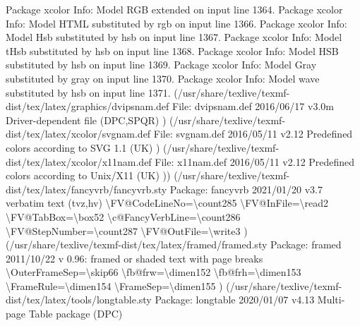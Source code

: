 \documentclass[
  letterpaper,
  DIV=11,
  numbers=noendperiod]{scrartcl}
\newenvironment{Shaded}{\begin{snugshade}}{\end{snugshade}}
\newcommand{\NormalTok}[1]{\textcolor[rgb]{0.00,0.23,0.31}{#1}}
\begin{document}
\begin{Shaded}
\begin{Highlighting}[]
\NormalTok{Package xcolor Info: Model \textasciigrave{}RGB\textquotesingle{} extended on input line 1364.}
\NormalTok{Package xcolor Info: Model \textasciigrave{}HTML\textquotesingle{} substituted by \textasciigrave{}rgb\textquotesingle{} on input line 1366.}
\NormalTok{Package xcolor Info: Model \textasciigrave{}Hsb\textquotesingle{} substituted by \textasciigrave{}hsb\textquotesingle{} on input line 1367.}
\NormalTok{Package xcolor Info: Model \textasciigrave{}tHsb\textquotesingle{} substituted by \textasciigrave{}hsb\textquotesingle{} on input line 1368.}
\NormalTok{Package xcolor Info: Model \textasciigrave{}HSB\textquotesingle{} substituted by \textasciigrave{}hsb\textquotesingle{} on input line 1369.}
\NormalTok{Package xcolor Info: Model \textasciigrave{}Gray\textquotesingle{} substituted by \textasciigrave{}gray\textquotesingle{} on input line 1370.}
\NormalTok{Package xcolor Info: Model \textasciigrave{}wave\textquotesingle{} substituted by \textasciigrave{}hsb\textquotesingle{} on input line 1371.}
\NormalTok{(/usr/share/texlive/texmf{-}dist/tex/latex/graphics/dvipsnam.def}
\NormalTok{File: dvipsnam.def 2016/06/17 v3.0m Driver{-}dependent file (DPC,SPQR)}
\NormalTok{) (/usr/share/texlive/texmf{-}dist/tex/latex/xcolor/svgnam.def}
\NormalTok{File: svgnam.def 2016/05/11 v2.12 Predefined colors according to SVG 1.1 (UK)}
\NormalTok{) (/usr/share/texlive/texmf{-}dist/tex/latex/xcolor/x11nam.def}
\NormalTok{File: x11nam.def 2016/05/11 v2.12 Predefined colors according to Unix/X11 (UK)}
\NormalTok{)) (/usr/share/texlive/texmf{-}dist/tex/latex/fancyvrb/fancyvrb.sty}
\NormalTok{Package: fancyvrb 2021/01/20 v3.7 verbatim text (tvz,hv)}
\NormalTok{\textbackslash{}FV@CodeLineNo=\textbackslash{}count285}
\NormalTok{\textbackslash{}FV@InFile=\textbackslash{}read2}
\NormalTok{\textbackslash{}FV@TabBox=\textbackslash{}box52}
\NormalTok{\textbackslash{}c@FancyVerbLine=\textbackslash{}count286}
\NormalTok{\textbackslash{}FV@StepNumber=\textbackslash{}count287}
\NormalTok{\textbackslash{}FV@OutFile=\textbackslash{}write3}
\NormalTok{) (/usr/share/texlive/texmf{-}dist/tex/latex/framed/framed.sty}
\NormalTok{Package: framed 2011/10/22 v 0.96: framed or shaded text with page breaks}
\NormalTok{\textbackslash{}OuterFrameSep=\textbackslash{}skip66}
\NormalTok{\textbackslash{}fb@frw=\textbackslash{}dimen152}
\NormalTok{\textbackslash{}fb@frh=\textbackslash{}dimen153}
\NormalTok{\textbackslash{}FrameRule=\textbackslash{}dimen154}
\NormalTok{\textbackslash{}FrameSep=\textbackslash{}dimen155}
\NormalTok{) (/usr/share/texlive/texmf{-}dist/tex/latex/tools/longtable.sty}
\NormalTok{Package: longtable 2020/01/07 v4.13 Multi{-}page Table package (DPC)}

\end{Highlighting}
\end{Shaded}
\end{document}
